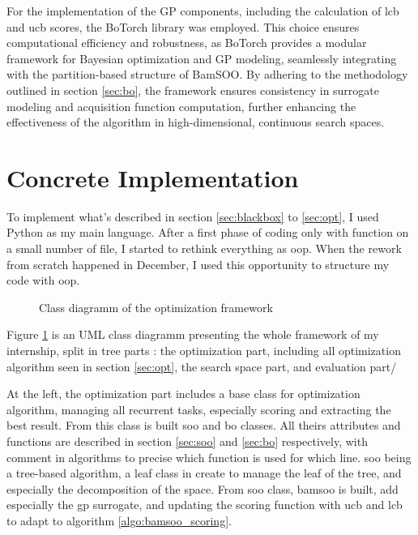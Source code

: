 For the implementation of the GP components, including the calculation of \acrshort{lcb} and \acrshort{ucb} scores, the BoTorch library was employed. This choice ensures computational efficiency and robustness, as BoTorch provides a modular framework for Bayesian optimization and GP modeling, seamlessly integrating with the partition-based structure of BamSOO. By adhering to the methodology outlined in section \ref{sec:bo}, the framework ensures consistency in surrogate modeling and acquisition function computation, further enhancing the effectiveness of the algorithm in high-dimensional, continuous search spaces.

\section{Concrete Implementation}
\label{sec:concrete_impl}
To implement what's described in section \ref{sec:blackbox} to \ref{sec:opt}, I used Python as my main language. After a first phase of coding only with function on a small number of file, I started to rethink everything as \acrfull{oop}. When the rework from scratch happened in December, I used this opportunity to structure my code with \acrshort{oop}. 

\begin{figure}[h]
    \centering
    
    \caption{Class diagramm of the optimization framework}
    \label{fig:class_diag}
\end{figure}

Figure \ref{fig:class_diag} is an UML class diagramm presenting the whole framework of my internship, split in tree parts : the optimization part, including all optimization algorithm seen in section \ref{sec:opt}, the search space part, and evaluation part/

At the left, the optimization part includes a base class for optimization algorithm, managing all recurrent tasks, especially scoring and extracting the best result. From this class is built \acrshort{soo} and \acrshort{bo} classes. All theirs attributes and functions are described in section \ref{sec:soo} and \ref{sec:bo} respectively, with comment in algorithms to precise which function is used for which line. \acrshort{soo} being a tree-based algorithm, a leaf class in create to manage the leaf of the tree, and especially the decomposition of the space. From \acrshort{soo} class, \acrshort{bamsoo} is built, add especially the \acrshort{gp} surrogate, and updating the scoring function with \acrshort{ucb} and \acrshort{lcb} to adapt to algorithm \ref{algo:bamsoo_scoring}.

